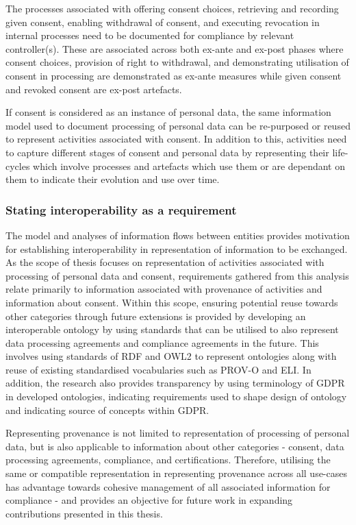 The processes associated with offering consent choices, retrieving and recording given consent, enabling withdrawal of consent, and executing revocation in internal processes need to be documented for compliance by relevant controller(s).
These are associated across both ex-ante and ex-post phases where consent choices, provision of right to withdrawal, and demonstrating utilisation of consent in processing are demonstrated as ex-ante measures while given consent and revoked consent are ex-post artefacts. 

If consent is considered as an instance of personal data, the same information model used to document processing of personal data can be re-purposed or reused to represent activities associated with consent. In addition to this, activities need to capture different stages of consent and personal data by representing their life-cycles which involve processes and artefacts which use them or are dependant on them to indicate their evolution and use over time. 

\subsubsection*{Stating interoperability as a requirement}
The model and analyses of information flows between entities provides motivation for establishing interoperability in representation of information to be exchanged.
As the scope of thesis focuses on representation of activities associated with processing of personal data and consent, requirements gathered from this analysis relate primarily to information associated with provenance of activities and information about consent.
Within this scope, ensuring potential reuse towards other categories through future extensions is provided by developing an interoperable ontology by using standards that can be utilised to also represent data processing agreements and compliance agreements in the future.
This involves using standards of RDF and OWL2 to represent ontologies along with reuse of existing standardised vocabularies such as PROV-O and ELI.
In addition, the research also provides transparency by using terminology of GDPR in developed ontologies, indicating requirements used to shape design of ontology and indicating source of concepts within GDPR.

Representing provenance is not limited to representation of processing of personal data, but is also applicable to information about other categories - consent, data processing agreements, compliance, and certifications. Therefore, utilising the same or compatible representation in representing provenance across all use-cases has advantage towards cohesive management of all associated information for compliance - and provides an objective for future work in expanding contributions presented in this thesis.

